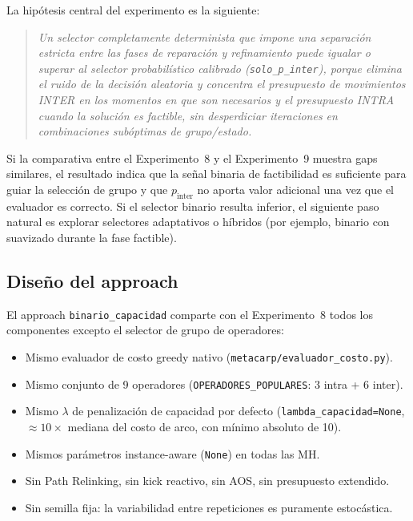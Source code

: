La hipótesis central del experimento es la siguiente:

\begin{quote}
\textit{Un selector completamente determinista que impone una
separación estricta entre las fases de reparación y refinamiento
puede igualar o superar al selector probabilístico calibrado
(\texttt{solo\_p\_inter}), porque elimina el ruido de la decisión
aleatoria y concentra el presupuesto de movimientos INTER en los
momentos en que son necesarios y el presupuesto INTRA cuando la
solución es factible, sin desperdiciar iteraciones en combinaciones
subóptimas de grupo/estado.}
\end{quote}

Si la comparativa entre el Experimento~8 y el Experimento~9 muestra
gaps similares, el resultado indica que la señal binaria de
factibilidad es suficiente para guiar la selección de grupo y que
$p_{\text{inter}}$ no aporta valor adicional una vez que el evaluador
es correcto. Si el selector binario resulta inferior, el siguiente paso
natural es explorar selectores adaptativos o híbridos (por ejemplo,
binario con suavizado durante la fase factible).

\subsection{Diseño del approach}

El approach \texttt{binario\_capacidad} comparte con el Experimento~8
todos los componentes excepto el selector de grupo de operadores:

\begin{itemize}
\item Mismo evaluador de costo greedy nativo
  (\texttt{metacarp/evaluador\_costo.py}).
\item Mismo conjunto de 9 operadores
  (\texttt{OPERADORES\_POPULARES}: 3 intra + 6 inter).
\item Mismo $\lambda$ de penalización de capacidad por defecto
  (\texttt{lambda\_capacidad=None}, $\approx 10\times$ mediana del
  costo de arco, con mínimo absoluto de 10).
\item Mismos parámetros instance-aware (\texttt{None}) en todas las MH.
\item Sin Path Relinking, sin kick reactivo, sin AOS, sin presupuesto
  extendido.
\item Sin semilla fija: la variabilidad entre repeticiones es
  puramente estocástica.
\end{itemize}

